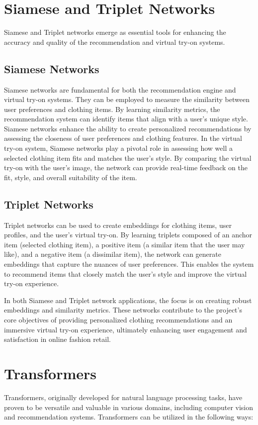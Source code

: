 \section{Siamese and Triplet Networks}
	Siamese and Triplet networks emerge as essential tools for enhancing the accuracy and quality of the recommendation and virtual try-on systems.

	\subsection{Siamese Networks}
		Siamese networks are fundamental for both the recommendation engine and virtual try-on systems. They can be employed to measure the similarity between user preferences and clothing items. By learning similarity metrics, the recommendation system can identify items that align with a user's unique style. Siamese networks enhance the ability to create personalized recommendations by assessing the closeness of user preferences and clothing features. In the virtual try-on system, Siamese networks play a pivotal role in assessing how well a selected clothing item fits and matches the user's style. By comparing the virtual try-on with the user's image, the network can provide real-time feedback on the fit, style, and overall suitability of the item.

	\subsection{Triplet Networks}
		Triplet networks can be used to create embeddings for clothing items, user profiles, and the user's virtual try-on. By learning triplets composed of an anchor item (selected clothing item), a positive item (a similar item that the user may like), and a negative item (a dissimilar item), the network can generate embeddings that capture the nuances of user preferences. This enables the system to recommend items that closely match the user's style and improve the virtual try-on experience.

	In both Siamese and Triplet network applications, the focus is on creating robust embeddings and similarity metrics. These networks contribute to the project's core objectives of providing personalized clothing recommendations and an immersive virtual try-on experience, ultimately enhancing user engagement and satisfaction in online fashion retail.

\section{Transformers}
	Transformers, originally developed for natural language processing tasks, have proven to be versatile and valuable in various domains, including computer vision and recommendation systems. Transformers can be utilized in the following ways:

